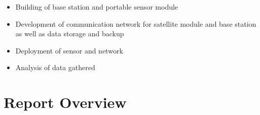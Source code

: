 \begin{itemize}
	\item Building of base station and portable sensor module
	\item Development of communication network for satellite module and base station as well as data storage and backup
	\item Deployment of sensor and network
	\item Analysis of data gathered
\end{itemize}

\section{Report Overview}













